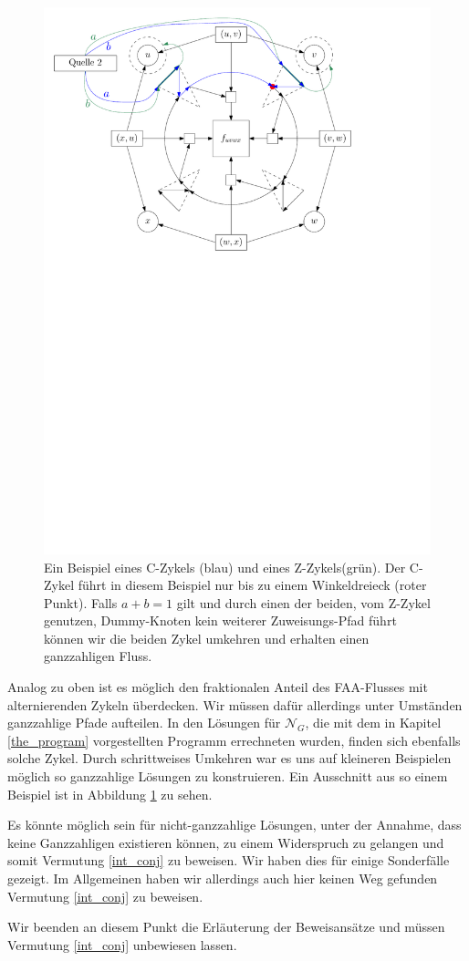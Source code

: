 \begin{figure}
\centering
\includegraphics[width=1\textwidth]{combined_face_alt_cycle.pdf}
\caption{Ein Beispiel eines C-Zykels (blau) und eines Z-Zykels(grün). Der C-Zykel führt in diesem Beispiel nur bis zu einem Winkeldreieck (roter Punkt). Falls $a+b=1$ gilt und durch einen der beiden, vom Z-Zykel genutzen, Dummy-Knoten kein weiterer Zuweisungs-Pfad führt können wir die beiden Zykel umkehren und erhalten einen ganzzahligen Fluss.}
\label{combined_face_alt_cycle}
\end{figure}

Analog zu oben ist es möglich den fraktionalen Anteil des FAA-Flusses mit alternierenden Zykeln überdecken. Wir müssen dafür allerdings unter Umständen ganzzahlige Pfade aufteilen. In den Lösungen für $\mathcal{N}_G$, die mit dem in Kapitel \ref{the_program} vorgestellten Programm errechneten wurden, finden sich ebenfalls solche Zykel. Durch schrittweises Umkehren war es uns auf kleineren Beispielen möglich so ganzzahlige Lösungen zu konstruieren. Ein Ausschnitt aus so einem Beispiel ist in Abbildung \ref{combined_face_alt_cycle} zu sehen.

Es könnte möglich sein für nicht-ganzzahlige Lösungen, unter der Annahme, dass keine Ganzzahligen existieren können, zu einem Widerspruch zu gelangen und somit Vermutung \ref{int_conj} zu beweisen. Wir haben dies für einige Sonderfälle gezeigt. 
Im Allgemeinen haben wir allerdings auch hier keinen Weg gefunden Vermutung \ref{int_conj} zu beweisen.

Wir beenden an diesem Punkt die Erläuterung der Beweisansätze und müssen Vermutung \ref{int_conj} unbewiesen lassen.

